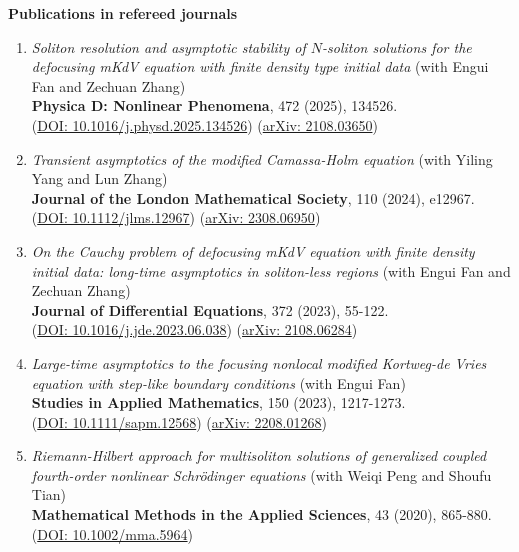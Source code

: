 \documentclass[margin]{res}
\begin{document}
\begin{resume}
\textbf{Publications in refereed journals}
\begin{enumerate}[1.]
    \item {\sl Soliton resolution and asymptotic stability of $N$-soliton solutions for the defocusing mKdV equation with finite density type initial data} (with Engui Fan and Zechuan Zhang)\\ 
    {\bf Physica D: Nonlinear Phenomena}, 472 (2025), 134526. \\
    (\href{https://doi.org/10.1016/j.physd.2025.134526}{DOI: 10.1016/j.physd.2025.134526}) (\href{https://arxiv.org/abs/2108.03650}{arXiv: 2108.03650})

    \item {\sl Transient asymptotics of the modified Camassa-Holm equation} (with Yiling Yang and Lun Zhang) \\
    {\bf Journal of the London Mathematical Society}, 110 (2024), e12967. \\
    (\href{https://londmathsoc.onlinelibrary.wiley.com/doi/10.1112/jlms.12967}{DOI: 10.1112/jlms.12967}) (\href{https://arxiv.org/abs/2308.06950}{arXiv: 2308.06950})

    \item {\sl On the Cauchy problem of defocusing mKdV equation with finite density initial data: long-time asymptotics in soliton-less regions} (with Engui Fan and Zechuan Zhang)\\
    {\bf Journal of Differential Equations}, 372 (2023), 55-122.\\
    (\href{https://www.sciencedirect.com/science/article/pii/S002203962300445X?via%3Dihub}{DOI: 10.1016/j.jde.2023.06.038}) (\href{https://arxiv.org/abs/2108.06284}{arXiv: 2108.06284})

    \item {\sl Large-time asymptotics to the focusing nonlocal modified Kortweg-de Vries equation with step-like boundary conditions} (with Engui Fan)\\
    {\bf Studies in Applied Mathematics}, 150 (2023), 1217-1273. \\
    (\href{https://onlinelibrary.wiley.com/doi/10.1111/sapm.12568}{DOI: 10.1111/sapm.12568}) (\href{https://arxiv.org/abs/2208.01268}{arXiv: 2208.01268})

    \item {\sl Riemann-Hilbert approach for multisoliton solutions of generalized coupled fourth-order nonlinear Schr\"odinger equations}
    (with Weiqi Peng and Shoufu Tian)\\
    {\bf Mathematical Methods in the Applied Sciences}, 43 (2020), 865-880.\\
    (\href{https://onlinelibrary.wiley.com/doi/10.1002/mma.5964}{DOI: 10.1002/mma.5964})
\end{enumerate}


\end{resume}
\end{document}
